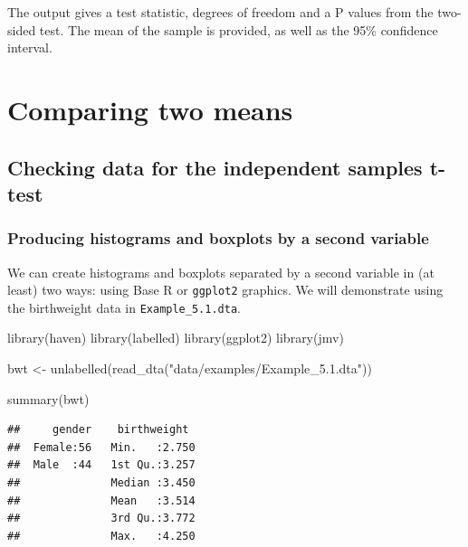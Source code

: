 \documentclass[
]{memoir}
\newenvironment{Shaded}{\begin{snugshade}}{\end{snugshade}}
\newcommand{\FunctionTok}[1]{\textcolor[rgb]{0.00,0.00,0.00}{#1}}
\newcommand{\NormalTok}[1]{#1}
\newcommand{\OtherTok}[1]{\textcolor[rgb]{0.56,0.35,0.01}{#1}}
\newcommand{\StringTok}[1]{\textcolor[rgb]{0.31,0.60,0.02}{#1}}
\begin{document}
The output gives a test statistic, degrees of freedom and a P values from the two-sided test. The mean of the sample is provided, as well as the 95\% confidence interval.

\hypertarget{comparing-two-means}{%
\chapter{Comparing two means}\label{comparing-two-means}}

\hypertarget{checking-data-for-the-independent-samples-t-test}{%
\section{Checking data for the independent samples t-test}\label{checking-data-for-the-independent-samples-t-test}}

\hypertarget{producing-histograms-and-boxplots-by-a-second-variable}{%
\subsection{Producing histograms and boxplots by a second variable}\label{producing-histograms-and-boxplots-by-a-second-variable}}

We can create histograms and boxplots separated by a second variable in (at least) two ways: using Base R or \texttt{ggplot2} graphics. We will demonstrate using the birthweight data in \texttt{Example\_5.1.dta}.

\begin{Shaded}
\begin{Highlighting}[]
\FunctionTok{library}\NormalTok{(haven)}
\FunctionTok{library}\NormalTok{(labelled)}
\FunctionTok{library}\NormalTok{(ggplot2)}
\FunctionTok{library}\NormalTok{(jmv)}

\NormalTok{bwt }\OtherTok{\textless{}{-}} \FunctionTok{unlabelled}\NormalTok{(}\FunctionTok{read\_dta}\NormalTok{(}\StringTok{"data/examples/Example\_5.1.dta"}\NormalTok{))}

\FunctionTok{summary}\NormalTok{(bwt)}
\end{Highlighting}
\end{Shaded}

\begin{verbatim}
##     gender    birthweight   
##  Female:56   Min.   :2.750  
##  Male  :44   1st Qu.:3.257  
##              Median :3.450  
##              Mean   :3.514  
##              3rd Qu.:3.772  
##              Max.   :4.250
\end{verbatim}
\end{document}
